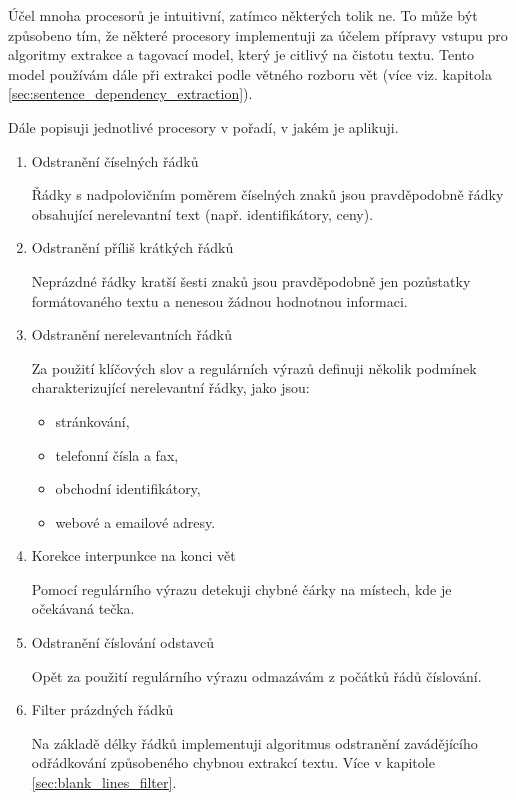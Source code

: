 \documentclass[thesis=M,czech]{FITthesis}[2019/12/23]
\begin{document}
Účel mnoha procesorů je intuitivní, zatímco některých tolik ne. To může být způsobeno tím, že některé procesory implementuji za účelem přípravy vstupu pro algoritmy extrakce a tagovací model, který je citlivý na čistotu textu. Tento model používám dále při extrakci podle větného rozboru vět (více viz. kapitola \ref{sec:sentence_dependency_extraction}).

Dále popisuji jednotlivé procesory v pořadí, v jakém je aplikuji.
\begin{enumerate}
    \item Odstranění číselných řádků
    
    Řádky s nadpolovičním poměrem číselných znaků jsou pravděpodobně řádky obsahující nerelevantní text (např. identifikátory, ceny).
    
    \item Odstranění příliš krátkých řádků
    
    Neprázdné řádky kratší šesti znaků jsou pravděpodobně jen pozůstatky formátovaného textu a nenesou žádnou hodnotnou informaci.
    
    \item Odstranění nerelevantních řádků
    
    Za použití klíčových slov a regulárních výrazů definuji několik podmínek charakterizující nerelevantní řádky, jako jsou:
    \begin{itemize}
        \item stránkování,
        \item telefonní čísla a fax,
        \item obchodní identifikátory,
        \item webové a emailové adresy.
    \end{itemize}
    
    \item Korekce interpunkce na konci vět
    
    Pomocí regulárního výrazu detekuji chybné čárky na místech, kde je očekávaná tečka.
    
    \item Odstranění číslování odstavců
    
    Opět za použití regulárního výrazu odmazávám z počátků řádů číslování.
    
    \item Filter prázdných řádků
    
    Na základě délky řádků implementuji algoritmus odstranění zavádějícího odřádkování způsobeného chybnou extrakcí textu. Více v kapitole \ref{sec:blank_lines_filter}.
    

\end{enumerate}
\end{document}
